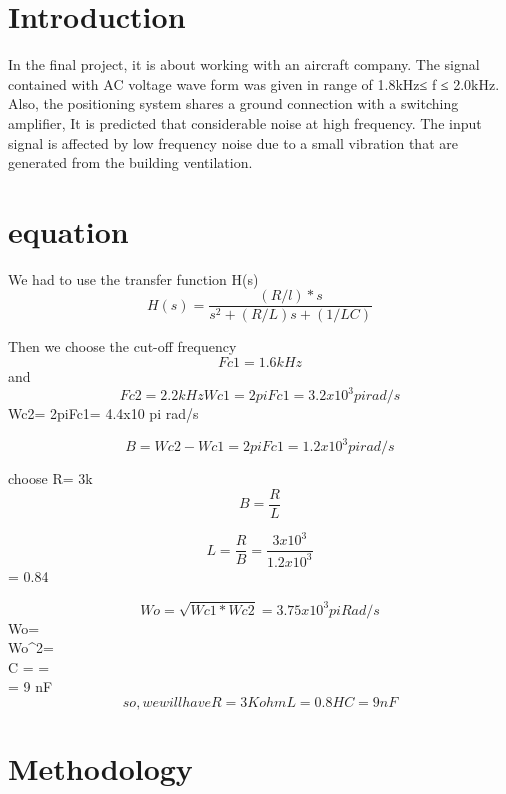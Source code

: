 \documentclass[12pt]{report}
\begin{document}
\section{Introduction}

In the final project, it is about working with an aircraft company. The signal contained with AC voltage wave form was given in range of 1.8kHz≤ f ≤ 2.0kHz. Also, the positioning system shares a ground connection with a switching amplifier, It is predicted that considerable noise at high frequency.  The input signal is affected by low frequency noise due to a small vibration that are generated from the building ventilation.






\section{equation}
We had to use the transfer function H(s)
$$H(s)=\frac{(R/l)*s}{s^2+{(R/L)s}+{(1/LC)}} $$

Then we choose the cut-off frequency $$Fc1=1.6kHz$$
and $$Fc2= 2.2kHz

Wc1= 2piFc1= 3.2x10^3 pi rad/s

$$Wc2= 2piFc1= 4.4x10 pi rad/s

$$B= Wc2-Wc1= 2piFc1= 1.2x10^3 pi rad/s $$

choose R= 3k
$$B= \frac{R}{L}$$

$$ L = \frac{R}{B} = \frac{3x10^3}{1.2x10^3}

$$= 0.84

$$Wo= \sqrt{Wc1*Wc2} = 3.75x10^3 pi Rad/s

$$Wo= $$

$$Wo^2= $$

$$ C = = $$

$$  = 9 nF$$

so, we will have R = 3K ohm

 L= 0.8 H 

C= 9nF



$$


\section{Methodology}
\end{document}
